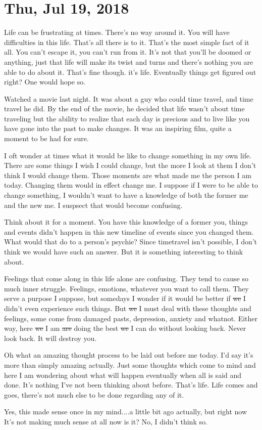 \section{Thu, Jul 19, 2018}

Life can be frustrating at times. There's no way around it. You will have
difficulties in this life. That's all there is to it. That's the most simple
fact of it all. You can't escape it, you can't run from it. It's not that you'll
be doomed or anything, just that life will make its twist and turns and there's
nothing you are able to do about it. That's fine though. it's life. Eventually
things get figured out right? One would hope so.

Watched a movie last night. It was about a guy who could time travel, and time
travel he did. By the end of the movie, he decided that life wasn't about time
traveling but the ability to realize that each day is precious and to live like
you have gone into the past to make changes. It was an inspiring film, quite a
moment to be had for sure.

I oft wonder at times what it would be like to change something in my own life.
There are some things I wish I could change, but the more I look at them I don't
think I would change them. Those moments are what made me the person I am today.
Changing them would in effect change me. I suppose if I were to be able to
change something, I wouldn't want to have a knowledge of both the former me and
the new me. I suspsect that would become confusing.

Think about it for a moment. You have this knowledge of a former you, things and
events didn't happen in this new timeline of events since you changed them. What
would that do to a person's psychie? Since timetravel isn't possible, I don't
think we would have such an answer. But it is something interesting to think
about.

Feelings that come along in this life alone are confusing. They tend to cause so
much inner struggle. Feelings, emotions, whatever you want to call them. They
serve a purpose I suppose, but somedays I wonder if it would be better if
\st{we} I didn't even experience such things. But \st{we} I must deal with these 
thoughts and feelings, some come from damaged pasts, depression, anxiety and 
whatnot. Either way, here \st{we} I am \st{are} doing the best \st{we} I can do 
without looking back. Never look back. It will destroy you.

Oh what an amazing thought process to be laid out before me today. I'd say it's 
more than simply amazing actually. Just some thoughts which come to mind and here I
am wondering about what will happen eventually when all is said and done. It's
nothing I've not been thinking about before. That's life. Life comes and goes,
there's not much else to be done regarding any of it.

Yes, this made sense once in my mind....a little bit ago actually, but right now It's
not making much sense at all now is it? No, I didn't think so.

